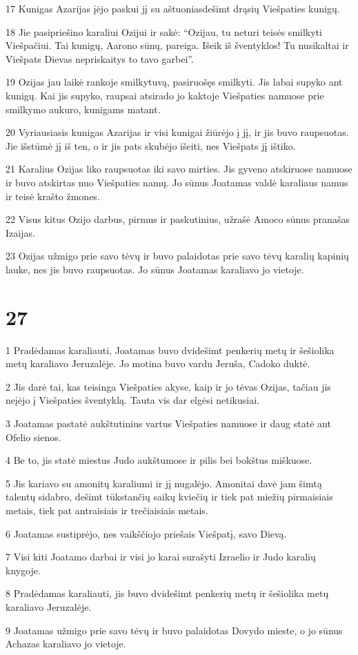 \par 17 Kunigas Azarijas įėjo paskui jį su aštuoniasdešimt drąsių Viešpaties kunigų. 
\par 18 Jie pasipriešino karaliui Ozijui ir sakė: “Ozijau, tu neturi teisės smilkyti Viešpačiui. Tai kunigų, Aarono sūnų, pareiga. Išeik iš šventyklos! Tu nusikaltai ir Viešpats Dievas nepriskaitys to tavo garbei”. 
\par 19 Ozijas jau laikė rankoje smilkytuvą, pasiruošęs smilkyti. Jis labai supyko ant kunigų. Kai jis supyko, raupsai atsirado jo kaktoje Viešpaties namuose prie smilkymo aukuro, kunigams matant. 
\par 20 Vyriausiasis kunigas Azarijas ir visi kunigai žiūrėjo į jį, ir jis buvo raupsuotas. Jie išstūmė jį iš ten, o ir jis pats skubėjo išeiti, nes Viešpats jį ištiko. 
\par 21 Karalius Ozijas liko raupsuotas iki savo mirties. Jis gyveno atskiruose namuose ir buvo atskirtas nuo Viešpaties namų. Jo sūnus Joatamas valdė karaliaus namus ir teisė krašto žmones. 
\par 22 Visus kitus Ozijo darbus, pirmus ir paskutinius, užrašė Amoco sūnus pranašas Izaijas. 
\par 23 Ozijas užmigo prie savo tėvų ir buvo palaidotas prie savo tėvų karalių kapinių lauke, nes jis buvo raupsuotas. Jo sūnus Joatamas karaliavo jo vietoje.



\chapter{27}


\par 1 Pradėdamas karaliauti, Joatamas buvo dvidešimt penkerių metų ir šešiolika metų karaliavo Jeruzalėje. Jo motina buvo vardu Jeruša, Cadoko duktė. 
\par 2 Jis darė tai, kas teisinga Viešpaties akyse, kaip ir jo tėvas Ozijas, tačiau jis neįėjo į Viešpaties šventyklą. Tauta vis dar elgėsi netikusiai. 
\par 3 Joatamas pastatė aukštutinius vartus Viešpaties namuose ir daug statė ant Ofelio sienos. 
\par 4 Be to, jis statė miestus Judo aukštumose ir pilis bei bokštus miškuose. 
\par 5 Jis kariavo su amonitų karaliumi ir jį nugalėjo. Amonitai davė jam šimtą talentų sidabro, dešimt tūkstančių saikų kviečių ir tiek pat miežių pirmaisiais metais, tiek pat antraisiais ir trečiaisiais metais. 
\par 6 Joatamas sustiprėjo, nes vaikščiojo priešais Viešpatį, savo Dievą. 
\par 7 Visi kiti Joatamo darbai ir visi jo karai surašyti Izraelio ir Judo karalių knygoje. 
\par 8 Pradėdamas karaliauti, jis buvo dvidešimt penkerių metų ir šešiolika metų karaliavo Jeruzalėje. 
\par 9 Joatamas užmigo prie savo tėvų ir buvo palaidotas Dovydo mieste, o jo sūnus Achazas karaliavo jo vietoje.



